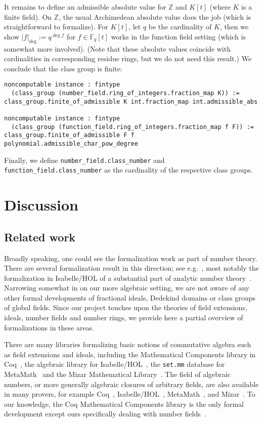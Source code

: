 \documentclass[a4paper,USenglish,cleveref, autoref, thm-restate]{lipics-v2021}
\newcommand{\lean}[1]{\texttt{#1}\xspace} %
\newcommand{\Z}{\mathbb{Z}}
\begin{document}
It remains to define an admissible absolute value for $\Z$ and $K[t]$ (where $K$ is a finite field).
On $\Z$, the usual Archimedean absolute value does the job (which is straightforward to formalize).
For $K[t]$, let $q$ be the cardinality of $K$, then we show $|f|_{\deg}:=q^{\deg f}$ for $f \in \mathbb{F}_q[t]$ works in the function field setting (which is somewhat more involved).
(Note that these absolute values coincide with cardinalities in corresponding residue rings, but we do not need this result.)
We conclude that the class group is finite:
\begin{lstlisting}
noncomputable instance : fintype
  (class_group (number_field.ring_of_integers.fraction_map K)) :=
class_group.finite_of_admissible K int.fraction_map int.admissible_abs

noncomputable instance : fintype
  (class_group (function_field.ring_of_integers.fraction_map f F)) :=
class_group.finite_of_admissible F f polynomial.admissible_char_pow_degree
\end{lstlisting}

Finally, we define \lean{number\_field.class\_number} and \lean{function\_field.class\_number} as the cardinality of the respective class groups.

\section{Discussion}

\subsection{Related work}

Broadly speaking, one could see the formalization work as part of number theory. There are several formalization result in this direction; see e.g.~\cite[Section 6]{CapSetProblem}, most notably the formalization in Isabelle/HOL of a substantial part of analytic number theory~\cite{Eberl19}.
Narrowing somewhat in on our more algebraic setting, we are not aware of any other formal developments of fractional ideals, Dedekind domains or class groups of global fields.
Since our project touches upon the theories of field extensions, ideals, number fields and number rings,
we provide here a partial overview of formalizations in these areas.

There are many libraries formalizing basic notions of commutative algebra such as field extensions and ideals, including the Mathematical Components library in Coq~\cite{mathcomp}, the algebraic library for Isabelle/HOL~\cite{algebra_isabelle}, the \texttt{set.mm} database for MetaMath~\cite{metamath} and the Mizar Mathematical Library~\cite{algebraic-hierarchy_mizar}. The field of algebraic numbers, or more generally algebraic closures of arbitrary fields, are also available in many provers, for example Coq~\cite{real-algebraic-numbers-coq, mathcomp}, Isabelle/HOL~\cite{algebraic-numbers-isabelle}, MetaMath~\cite{algebraic-numbers-metamath}, and Mizar~\cite{algebraic-numbers-mizar}. To our knowledge, the Coq Mathematical Components library is the only formal development except ours specifically dealing with number fields~\cite[\texttt{field/algnum.v}]{mathcomp}.
\end{document}
